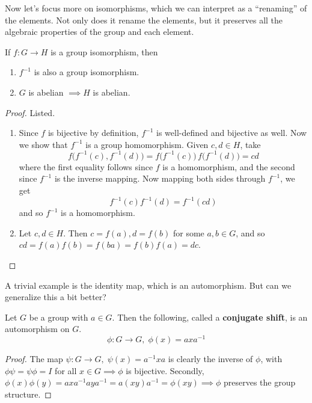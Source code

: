   Now let's focus more on isomorphisms, which we can interpret as a ``renaming'' of the elements. Not only does it rename the elements, but it preserves all the algebraic properties of the group and each element. 

  \begin{theorem}
    If $f: G \to H$ is a group isomorphism, then 
    \begin{enumerate}
      \item $f^{-1}$ is also a group isomorphism. 
      \item $G$ is abelian $\implies H$ is abelian. 
    \end{enumerate} 
  \end{theorem}
  \begin{proof}
    Listed. 
    \begin{enumerate}
      \item Since $f$ is bijective by definition, $f^{-1}$ is well-defined and bijective as well. Now we show that $f^{-1}$ is a group homomorphism. Given $c, d \in H$, take 
      \begin{equation}
        f \big( f^{-1} (c), f^{-1} (d)\big) = f \big( f^{-1} (c) \big) \, f \big( f^{-1} (d) \big) = cd 
      \end{equation}
      where the first equality follows since $f$ is a homomorphism, and the second since $f^{-1}$ is the inverse mapping. Now mapping both sides through $f^{-1}$, we get 
      \begin{equation}
        f^{-1} (c) f^{-1} (d) = f^{-1} (cd)
      \end{equation}
      and so $f^{-1}$ is a homomorphism. 
      \item Let $c, d \in H$. Then $c = f(a), d = f(b)$ for some $a, b \in G$, and so $cd = f(a) f(b) = f(ba) = f(b) f(a) = dc$. 
    \end{enumerate}
  \end{proof}

  A trivial example is the identity map, which is an automorphism. But can we generalize this a bit better? 

  \begin{theorem}
    Let $G$ be a group with $a \in G$. Then the following, called a \textbf{conjugate shift}, is an automorphism on $G$. 
    \begin{equation}
      \phi: G \longrightarrow G, \; \phi (x) = a x a^{-1}
    \end{equation}
  \end{theorem}
  \begin{proof}
    The map $\psi: G \longrightarrow G, \; \psi(x) = a^{-1} x a$ is clearly the inverse of $\phi$, with $\phi \psi = \psi \phi = I$ for all $x \in G \implies \phi$ is bijective. Secondly, $\phi(x) \phi(y) = a x a^{-1} a y a^{-1} = a (x y) a ^{-1} = \phi (x y) \implies \phi$ preserves the group structure. 
  \end{proof} 

